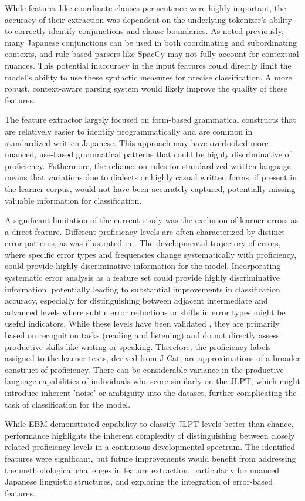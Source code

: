 While features like coordinate clauses per sentence were highly important, the accuracy of their extraction was
dependent on the underlying tokenizer's ability to correctly identify conjunctions and clause boundaries. As noted
previously, many Japanese conjunctions can be used in both coordinating and subordinating contexts, and rule-based
parsers like SpacCy may not fully account for contextual nuances. This potential inaccuracy in the input features
could directly limit the model's ability to use these syntactic measures for precise classification. A more robust,
context-aware parsing system would likely improve the quality of these features.

The feature extractor largely focused on form-based grammatical constructs that are relatively easier to identify
programmatically and are common in standardized written Japanese. This approach may have overlooked more nuanced,
use-based grammatical patterns that could be highly discriminative of proficiency. Futhermore, the reliance on rules
for standardized written language means that variations due to dialects or highly casual written forms, if present
in the learner corpus, would not have been accurately captured, potentially missing valuable information for
classification.

A significant limitation of the current study was the exclusion of learner errors as a direct feature. Different
proficiency levels are often
characterized by distinct error patterns, as was illustrated in \citet{Hawkins_Buttery_2010}.  The
developmental trajectory of errors, where specific error types and frequencies change systematically with
proficiency, could provide highly discriminative information for the model.
Incorporating
systematic error analysis as a
feature
set
could provide
highly discriminative information, potentially leading to substantial improvements in classification accuracy,
especially for distinguishing between adjacent intermediate and advanced levels where subtle error reductions or
shifts in error types might be useful indicators. While these levels have been validated
\citet{jcat_interpretation_guide}, they
are primarily based on recognition tasks (reading and listening) and do not directly assess productive skills like
writing or speaking. Therefore, the proficiency labels assigned to the learner texts, derived from J-Cat, are approximations of a broader construct of proficiency. There can be considerable variance in the productive language capabilities of individuals who score similarly on the JLPT, which might introduce inherent 'noise' or ambiguity into the dataset, further complicating the task of classification for the model.

While EBM demonstrated capability to classify JLPT levels better than chance, performance highlights the inherent
complexity of distinguishing between closely related proficiency levels in a continuous developmental spectrum. The
identified features were significant, but future improvements would benefit from addressing the methodological
challenges in feature extraction, particularly for nuanced Japanese linguistic structures, and exploring the
integration of error-based features.